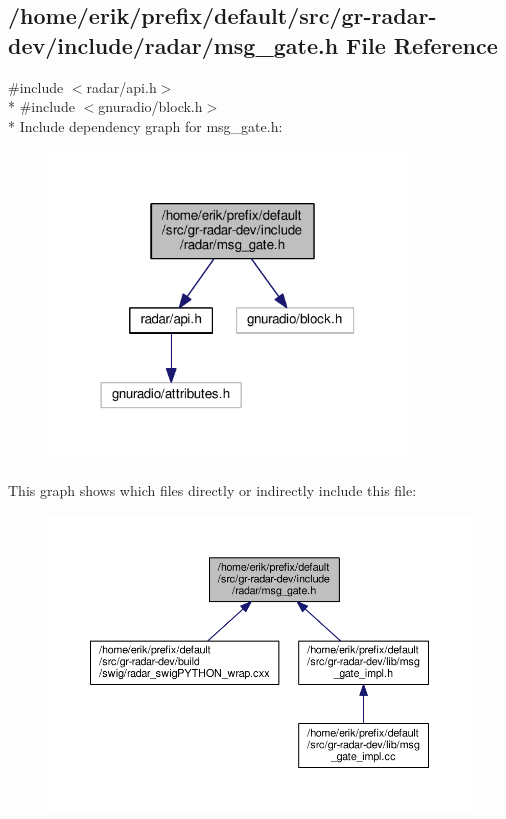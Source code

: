 \subsection{/home/erik/prefix/default/src/gr-\/radar-\/dev/include/radar/msg\+\_\+gate.h File Reference}
\label{msg__gate_8h}
{\ttfamily \#include $<$radar/api.\+h$>$}\\*
{\ttfamily \#include $<$gnuradio/block.\+h$>$}\\*
Include dependency graph for msg\+\_\+gate.\+h\+:
\nopagebreak
\begin{figure}[H]
\begin{center}
\leavevmode
\includegraphics[width=270pt]{d3/dac/msg__gate_8h__incl}
\end{center}
\end{figure}
This graph shows which files directly or indirectly include this file\+:
\nopagebreak
\begin{figure}[H]
\begin{center}
\leavevmode
\includegraphics[width=350pt]{d4/d29/msg__gate_8h__dep__incl}
\end{center}
\end{figure}
